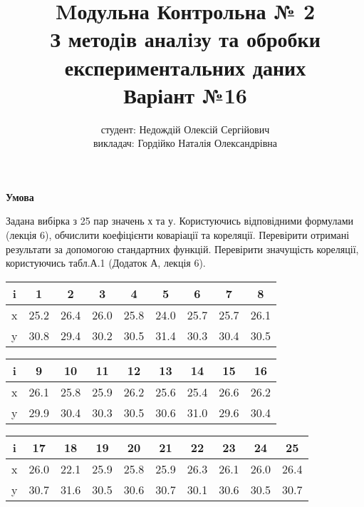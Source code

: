 \documentclass[12pt]{article}
\author{студент: Недождій Олексій Сергійович \\
         викладач: Гордійко Наталія Олександрівна}
\title{Mодульна Контрольна № 2\\
    З методiв аналiзу та обробки\\
    експериментальних даних\\
       Варіант №16}
\date{}
\begin{document}
\maketitle

\begin{center}
    {\Large \bf Умова}
\end{center}
Задана вибірка з 25 пар значень х та у. Користуючись відповідними формулами (лекція 6), обчислити коефіцієнти коваріації та кореляції. Перевірити отримані результати за допомогою стандартних функцій. Перевірити значущість кореляції, користуючись табл.А.1 (Додаток А, лекція 6).

\vspace{1em}

\begin{center}
    \begin{tabular}{|c|c|c|c|c|c|c|c|c|}
        \hline
        i & 1 & 2 & 3 & 4 & 5 & 6 & 7 & 8\\
        \hline
        x & 25.2 & 26.4 & 26.0 & 25.8 & 24.0 & 25.7 & 25.7 & 26.1\\
        \hline
        y & 30.8 & 29.4 & 30.2 & 30.5 & 31.4 & 30.3 & 30.4 & 30.5\\
        \hline
    \end{tabular}
\end{center}

\vspace{1em}

\begin{center}
    \begin{tabular}{|c|c|c|c|c|c|c|c|c|}
        \hline
        i & 9 & 10 & 11 & 12 & 13 & 14 & 15 & 16\\
        \hline
        x & 26.1 & 25.8 & 25.9 & 26.2 & 25.6 & 25.4 & 26.6 & 26.2\\
        \hline
        y & 29.9 & 30.4 & 30.3 & 30.5 & 30.6 & 31.0 & 29.6 & 30.4\\
        \hline
    \end{tabular}
\end{center}

\vspace{1em}

\begin{center}
    \begin{tabular}{|c|c|c|c|c|c|c|c|c|c|}
        \hline
        i & 17 & 18 & 19 & 20 & 21 & 22 & 23 & 24 & 25\\
        \hline
        x & 26.0 & 22.1 & 25.9 & 25.8 & 25.9 & 26.3 & 26.1 & 26.0 & 26.4\\
        \hline
        y & 30.7 & 31.6 & 30.5 & 30.6 & 30.7 & 30.1 & 30.6 & 30.5 & 30.7\\
        \hline
    \end{tabular}
\end{center}
\end{document}
